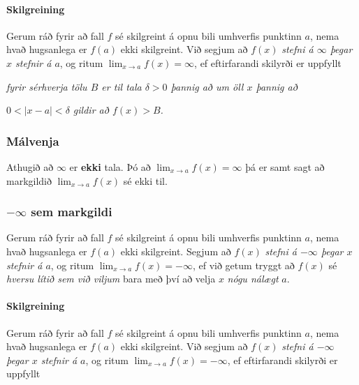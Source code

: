 \documentclass[icelandic,a4paper,12pt]{article}
\begin{document}
 
\pause
\paragraph{Skilgreining}
 Gerum ráð fyrir að fall $f$ sé
skilgreint á opnu bili umhverfis punktinn $a$, nema hvað hugsanlega er
$f(a)$ ekki skilgreint.  Við segjum að $f(x)$
{\it stefni á $\infty$ þegar $x$ stefnir á $a$}, og ritum
$\lim_{x\rightarrow a} f(x)=\infty$, ef eftirfarandi skilyrði er uppfyllt

{\it fyrir sérhverja tölu $B$ er til tala $\delta>0$ þannig
  að um öll $x$ þannig að} 

{\em $0<|x-a|<\delta$ 
gildir að  $f(x)>B$.}




\subsubsection*{Málvenja}
 Athugið að $\infty$ er {\bf ekki} tala.  Þó 
að  $\lim_{x\rightarrow a} f(x)=\infty$ þá er samt sagt að
markgildið $\lim_{x\rightarrow a} f(x)$ sé ekki til.
 


\subsubsection*{$-\infty$ sem markgildi}
 Gerum ráð fyrir að fall $f$ sé
skilgreint á opnu bili umhverfis punktinn $a$, nema hvað hugsanlega er
$f(a)$ ekki skilgreint.  Segjum að  $f(x)$
{\it stefni á $-\infty$ þegar $x$ stefnir á $a$}, og ritum
$\lim_{x\rightarrow a} f(x)=-\infty$, ef við getum tryggt að  $f(x)$ sé {\em
  hversu lítið sem við viljum}
 bara með því að velja $x$ {\em nógu nálægt} $a$.  

 
\pause
\paragraph{Skilgreining}
 Gerum ráð fyrir að fall $f$ sé
skilgreint á opnu bili umhverfis punktinn $a$, nema hvað hugsanlega er
$f(a)$ ekki skilgreint.  Við segjum að $f(x)$
{\it stefni á $-\infty$ þegar $x$ stefnir á $a$}, og ritum
$\lim_{x\rightarrow a} f(x)=-\infty$, ef eftirfarandi skilyrði er uppfyllt
\end{document}
